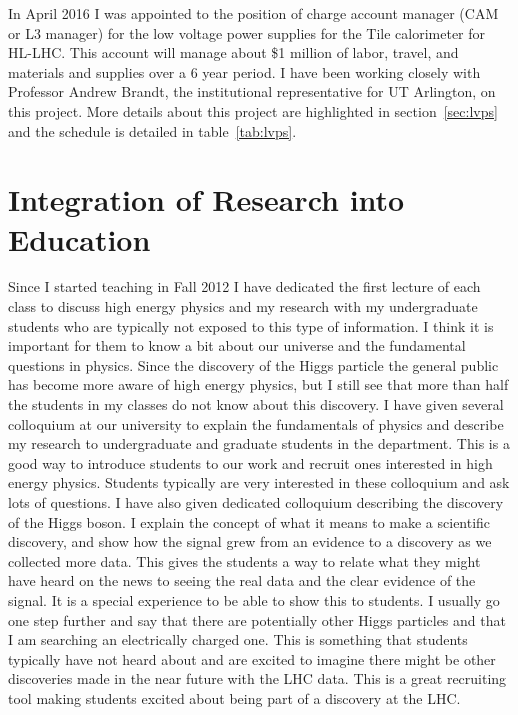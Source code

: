 \documentclass[11pt]{article}
\begin{document}
In April 2016 I was appointed to the position of charge account manager (CAM or L3 manager) for the low voltage power supplies for the Tile calorimeter for HL-LHC.  This account will manage about \$1 million 
of labor, travel, and materials and supplies over a 6 year period.  
I have been working closely with Professor Andrew Brandt, the institutional representative for UT Arlington, on this project.
More details about this project are highlighted in section~\ref{sec:lvps} and the schedule is detailed in table~\ref{tab:lvps}.

\section{Integration of Research into Education}
\label{sec:edu}
Since I started teaching in Fall 2012 I have dedicated the first lecture of each class to discuss high energy physics and my research with my undergraduate students who are typically not exposed to this type of information.  I think it is important for them 
to know a bit about our universe and the fundamental questions in physics.  Since the discovery of the Higgs particle the general public has become more aware of high energy physics, but I still see that more than half the students in my
classes do not know about this discovery.  
I have given several colloquium at our university to explain the fundamentals of physics and describe my research to undergraduate and graduate students in the department.  This is a good way to introduce students to our work and
recruit ones interested in high energy physics.  Students typically are very interested in these colloquium and ask lots of questions.  I have also given dedicated colloquium describing the discovery of the Higgs boson.  I explain
the concept of what it means to make a scientific discovery, and show how the signal grew from an evidence to a discovery as we collected more data.  This gives the students a way to relate what they might have heard on the news to seeing the real data and the clear evidence
of the signal.  It is a special experience to be able to show this to students.  I usually go one step further and say that there are potentially other Higgs particles and that I am searching an electrically charged one.
This is something that students typically have not heard about and are excited to imagine there might be other discoveries made in the near future with the LHC data.
This is a great recruiting tool making students excited about being part of a  discovery at the LHC.
\end{document}
